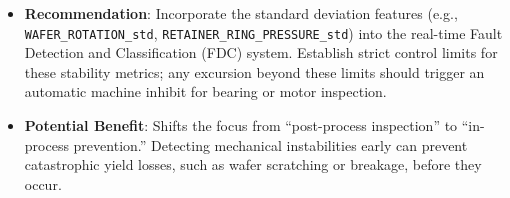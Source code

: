 \documentclass[11pt]{article}
\providecommand{\tightlist}{%
      \setlength{\itemsep}{0pt}\setlength{\parskip}{0pt}}
\begin{document}
\begin{itemize}
\tightlist
\item
  \textbf{Recommendation}: Incorporate the standard deviation features
  (e.g., \texttt{WAFER\_ROTATION\_std},
  \texttt{RETAINER\_RING\_PRESSURE\_std}) into the real-time Fault
  Detection and Classification (FDC) system. Establish strict control
  limits for these stability metrics; any excursion beyond these limits
  should trigger an automatic machine inhibit for bearing or motor
  inspection.
\item
  \textbf{Potential Benefit}: Shifts the focus from ``post-process
  inspection'' to ``in-process prevention.'' Detecting mechanical
  instabilities early can prevent catastrophic yield losses, such as
  wafer scratching or breakage, before they occur.
\end{itemize}

    


    
    
    
\end{document}
